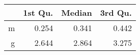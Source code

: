 \begin{table}[ht]
\centering
\begin{tabular}{rrrr}
  \hline
 & 1st Qu. & Median & 3rd Qu. \\ 
  \hline
m & 0.254 & 0.341 & 0.442 \\ 
  g & 2.644 & 2.864 & 3.275 \\ 
   \hline
\end{tabular}
\end{table}
